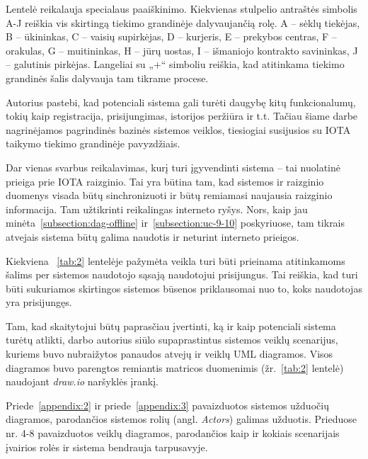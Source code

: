 Lentelė reikalauja specialaus paaiškinimo. Kiekvienas stulpelio antraštės simbolis A-J reiškia vis skirtingą tiekimo grandinėje dalyvaujančią rolę. A – sėklų tiekėjas, B – ūkininkas, C – vaisių supirkėjas, D – kurjeris, E – prekybos centras, F – orakulas, G – muitininkas, H – jūrų uostas, I – išmaniojo kontrakto savininkas, J – galutinis pirkėjas. Langeliai su „+“ simboliu reiškia, kad atitinkama tiekimo grandinės šalis dalyvauja tam tikrame procese.

Autorius pastebi, kad potenciali sistema gali turėti daugybę kitų funkcionalumų, tokių kaip registracija, prisijungimas, istorijos peržiūra ir t.t. Tačiau šiame darbe nagrinėjamos pagrindinės bazinės sistemos veiklos, tiesiogiai susijusios su IOTA taikymo tiekimo grandinėje pavyzdžiais. 

Dar vienas svarbus reikalavimas, kurį turi įgyvendinti sistema – tai nuolatinė prieiga prie IOTA raizginio. Tai yra būtina tam, kad sistemos ir raizginio duomenys visada būtų sinchronizuoti ir būtų remiamasi naujausia raizginio informacija. Tam užtikrinti reikalingas interneto ryšys. Nors, kaip jau minėta~\ref{subsection:dag-offline} ir~\ref{subsection:uc-9-10} poskyriuose, tam tikrais atvejais sistema būtų galima naudotis ir neturint interneto prieigos.

Kiekviena ~\ref{tab:2} lentelėje pažymėta veikla turi būti prieinama atitinkamoms šalims per sistemos naudotojo sąsają naudotojui prisijungus. Tai reiškia, kad turi būti sukuriamos skirtingos sistemos būsenos priklausomai nuo to, koks naudotojas yra prisijungęs. 

Tam, kad skaitytojui būtų paprasčiau įvertinti, ką ir kaip potenciali sistema turėtų atlikti, darbo autorius siūlo supaprastintus sistemos veiklų scenarijus, kuriems buvo nubraižytos panaudos atvejų ir veiklų UML diagramos. Visos diagramos buvo parengtos remiantis matricos duomenimis (žr.~\ref{tab:2} lentelė) naudojant \textit{draw.io} naršyklės įrankį. 

Priede~\ref{appendix:2} ir priede~\ref{appendix:3} pavaizduotos sistemos užduočių diagramos, parodančios sistemos rolių (angl. \textit{Actors}) galimas užduotis. Prieduose nr. 4-8 pavaizduotos veiklų diagramos, parodančios kaip ir kokiais scenarijais įvairios rolės ir sistema bendrauja tarpusavyje.